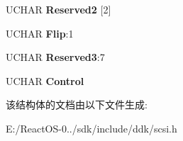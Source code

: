 \begin{DoxyCompactItemize}
U\+C\+H\+AR {\bfseries Reserved2} \mbox{[}2\mbox{]}
\item 
\mbox{\label{struct___c_d_b_1_1___m_o_v_e___m_e_d_i_u_m_aa4eb00f087cfce53b76ea709883f81f5}} 
U\+C\+H\+AR {\bfseries Flip}\+:1
\item 
\mbox{\label{struct___c_d_b_1_1___m_o_v_e___m_e_d_i_u_m_a795c251bb032079fd58f68edde27dcc7}} 
U\+C\+H\+AR {\bfseries Reserved3}\+:7
\item 
\mbox{\label{struct___c_d_b_1_1___m_o_v_e___m_e_d_i_u_m_ab700610b66c8064d60dd09197a9e2e7e}} 
U\+C\+H\+AR {\bfseries Control}
\end{DoxyCompactItemize}


该结构体的文档由以下文件生成\+:\begin{DoxyCompactItemize}
\item 
E\+:/\+React\+O\+S-\/0../sdk/include/ddk/scsi.\+h\end{DoxyCompactItemize}
